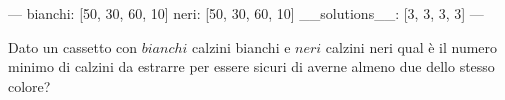 ---
bianchi: [50, 30, 60, 10]
neri: [50, 30, 60, 10]
__solutions__: [3, 3, 3, 3]
---

\begin{esercizio}{3}
Dato un cassetto con ${bianchi}$ calzini bianchi e ${neri}$ calzini neri qual è il numero minimo di
calzini da estrarre per essere sicuri di averne almeno due dello stesso colore?

\rispostaaperta
\end{esercizio}
